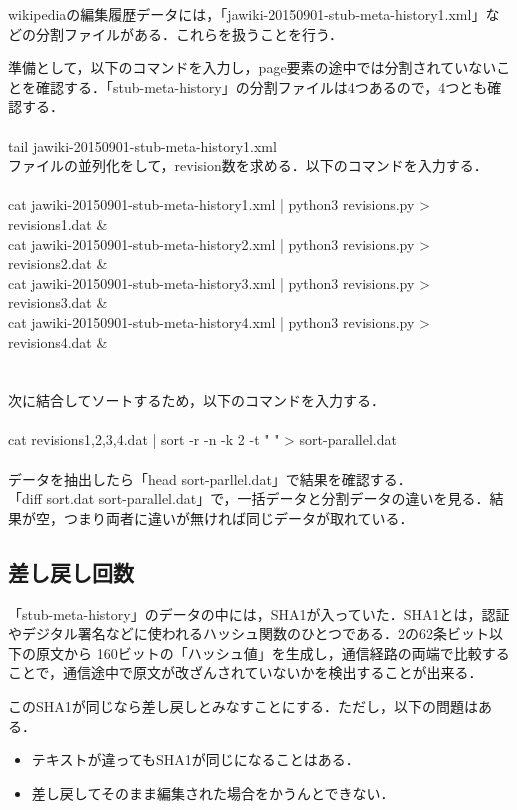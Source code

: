 wikipediaの編集履歴データには，「jawiki-20150901-stub-meta-history1.xml」などの分割ファイルがある．これらを扱うことを行う．

準備として，以下のコマンドを入力し，page要素の途中では分割されていないことを確認する．「stub-meta-history」の分割ファイルは4つあるので，4つとも確認する．
\\
\\
tail jawiki-20150901-stub-meta-history1.xml
\\
ファイルの並列化をして，revision数を求める．以下のコマンドを入力する．
\\
\\
cat jawiki-20150901-stub-meta-history1.xml | python3 revisions.py > revisions1.dat \& \\
cat jawiki-20150901-stub-meta-history2.xml | python3 revisions.py > revisions2.dat \& \\
cat jawiki-20150901-stub-meta-history3.xml | python3 revisions.py > revisions3.dat \& \\
cat jawiki-20150901-stub-meta-history4.xml | python3 revisions.py > revisions4.dat \& \\
\\
\\
次に結合してソートするため，以下のコマンドを入力する．
\\
\\
cat revisions{1,2,3,4}.dat | sort -r -n -k 2 -t "   " > sort-parallel.dat
\\
\\
データを抽出したら「head sort-parllel.dat」で結果を確認する． \\
「diff sort.dat sort-parallel.dat」で，一括データと分割データの違いを見る．結果が空，つまり両者に違いが無ければ同じデータが取れている．




\subsection{差し戻し回数}

「stub-meta-history」のデータの中には，SHA1が入っていた．SHA1とは，認証やデジタル署名などに使われるハッシュ関数のひとつである．2の62条ビット以下の原文から
160ビットの「ハッシュ値」を生成し，通信経路の両端で比較することで，通信途中で原文が改ざんされていないかを検出することが出来る．

このSHA1が同じなら差し戻しとみなすことにする．ただし，以下の問題はある．
\begin{itemize}
 \item テキストが違ってもSHA1が同じになることはある．
 \item 差し戻してそのまま編集された場合をかうんとできない．
\end{itemize}

